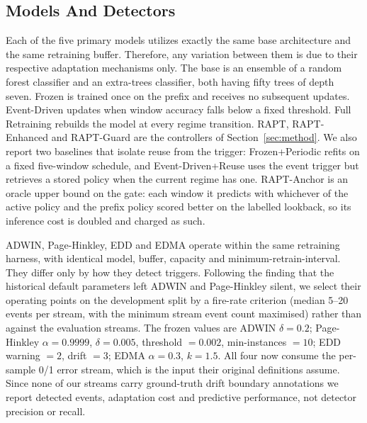 \subsection{Models And Detectors}
Each of the five primary models utilizes exactly the same base architecture and the same retraining buffer. Therefore, any variation between them is due to their respective adaptation mechanisms only. The base is an ensemble of a random forest classifier and an extra-trees classifier, both having fifty trees of depth seven. Frozen is trained once on the prefix and receives no subsequent updates. Event-Driven updates when window accuracy falls below a fixed threshold. Full Retraining rebuilds the model at every regime transition. RAPT, RAPT-Enhanced and RAPT-Guard are the controllers of Section~\ref{sec:method}. We also report two baselines that isolate reuse from the trigger: Frozen+Periodic refits on a fixed five-window schedule, and Event-Driven+Reuse uses the event trigger but retrieves a stored policy when the current regime has one. RAPT-Anchor is an oracle upper bound on the gate: each window it predicts with whichever of the active policy and the prefix policy scored better on the labelled lookback, so its inference cost is doubled and charged as such.


ADWIN, Page-Hinkley, EDD and EDMA operate within the same retraining harness, with identical model, buffer, capacity and minimum-retrain-interval. They differ only by how they detect triggers. Following the finding that the historical default parameters left ADWIN and Page-Hinkley silent, we select their operating points on the development split by a fire-rate criterion (median 5--20 events per stream, with the minimum stream event count maximised) rather than against the evaluation streams. The frozen values are ADWIN $\delta=0.2$; Page-Hinkley $\alpha=0.9999$, $\delta=0.005$, threshold $=0.002$, min-instances $=10$; EDD warning $=2$, drift $=3$; EDMA $\alpha=0.3$, $k=1.5$. All four now consume the per-sample 0/1 error stream, which is the input their original definitions assume. Since none of our streams carry ground-truth drift boundary annotations we report detected events, adaptation cost and predictive performance, not detector precision or recall.


